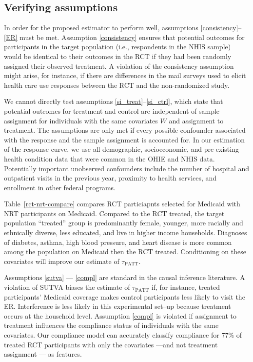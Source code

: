 \documentclass[12pt]{article}
\begin{document}
\subsection{Verifying assumptions}

In order for the proposed estimator to perform well, assumptions \eqref{consistency}--\eqref{ER} must be met.  Assumption \eqref{consistency} ensures that potential outcomes for participants in the target population (i.e., respondents in the NHIS sample) would be identical to their outcomes in the RCT if they had been randomly assigned their observed treatment. A violation of the consistency assumption might arise, for instance, if there are differences in the mail surveys used to elicit health care use responses between the RCT and the non-randomized study. 
 
We cannot directly test assumptions \eqref{si_treat}--\eqref{si_ctrl}, which state that potential outcomes for treatment and control are independent of sample assignment for individuals with the same covariates $W$ and assignment to treatment.  The assumptions are only met if every possible confounder associated with the response and the sample assignment is accounted for.  In our estimation of the response curve, we use all demographic, socioeconomic, and pre-existing health condition data that were common in the OHIE and NHIS data.  Potentially important unobserved confounders include the number of hospital and outpatient visits in the previous year, proximity to health services, and enrollment in other federal programs. 

Table~\ref{rct-nrt-compare} compares RCT particiapnts selected for Medicaid with NRT participants on Medicaid. Compared to the RCT treated, the target population ``treated''  group is predominantly female, younger, more racially and ethnically diverse, less educated, and live in higher income households. Diagnoses of diabetes, asthma, high blood pressure, and heart disease is more common among the population on Medicaid then the RCT treated. Conditioning on these covariates will improve our estimate of $\tau_{\text{PATT}}$. 


Assumptions \ref{sutva} ---  \ref{compl} are standard in the causal inference literature. A violation of SUTVA biases the estimate of $\tau_{\text{PATT}}$ if, for instance, treated participants' Medicaid coverage makes control participants less likely to visit the ER. Interference is less likely in this experimental set--up because treatment occurs at the household level.  Assumption \ref{compl} is violated if assignment to treatment influences the compliance status of individuals with the same covariates. Our compliance model can accurately classify compliance for 77\% of treated RCT participants with only the covariates ---and not treatment assignment --- as features.
 
\end{document}
